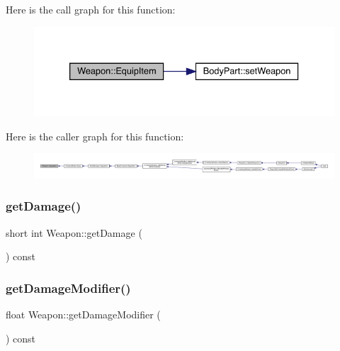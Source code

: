 Here is the call graph for this function\+:
\nopagebreak
\begin{figure}[H]
\begin{center}
\leavevmode
\includegraphics[width=333pt]{db/de5/class_weapon_af7fda0b6e0d4ce8f25e2b0e4ad5fd94d_cgraph}
\end{center}
\end{figure}
Here is the caller graph for this function\+:
\nopagebreak
\begin{figure}[H]
\begin{center}
\leavevmode
\includegraphics[width=350pt]{db/de5/class_weapon_af7fda0b6e0d4ce8f25e2b0e4ad5fd94d_icgraph}
\end{center}
\end{figure}
\mbox{\label{class_weapon_adb39958d1bfe60371314991040ab04fd}} 
\subsubsection{\texorpdfstring{get\+Damage()}{getDamage()}}
{\footnotesize\ttfamily short int Weapon\+::get\+Damage (\begin{DoxyParamCaption}{ }\end{DoxyParamCaption}) const}

\mbox{\label{class_weapon_aa721632fc6af9548259814f4a4795757}} 
\subsubsection{\texorpdfstring{get\+Damage\+Modifier()}{getDamageModifier()}}
{\footnotesize\ttfamily float Weapon\+::get\+Damage\+Modifier (\begin{DoxyParamCaption}{ }\end{DoxyParamCaption}) const}


